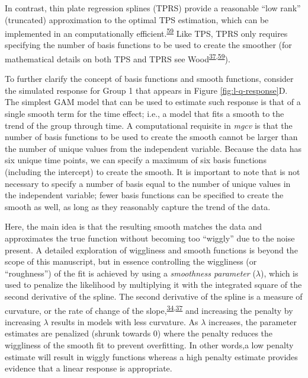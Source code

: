 \documentclass[
]{article}
\begin{document}
In contrast, thin plate regression splines (TPRS) provide a reasonable ``low rank'' (truncated) approximation to the optimal TPS estimation, which can be implemented in an computationally efficient.\textsuperscript{\protect\hyperlink{ref-wood2003}{59}} Like TPS, TPRS only requires specifying the number of basis functions to be used to create the smoother (for mathematical details on both TPS and TPRS see Wood\textsuperscript{\protect\hyperlink{ref-wood2017}{37},\protect\hyperlink{ref-wood2003}{59}}).

To further clarify the concept of basis functions and smooth functions, consider the simulated response for Group 1 that appears in Figure \ref{fig:l-q-response}D. The simplest GAM model that can be used to estimate such response is that of a single smooth term for the time effect; i.e., a model that fits a smooth to the trend of the group through time. A computational requisite in \emph{mgcv} is that the number of basis functions to be used to create the smooth cannot be larger than the number of unique values from the independent variable. Because the data has six unique time points, we can specify a maximum of six basis functions (including the intercept) to create the smooth. It is important to note that is not necessary to specify a number of basis equal to the number of unique values in the independent variable; fewer basis functions can be specified to create the smooth as well, as long as they reasonably capture the trend of the data.

Here, the main idea is that the resulting smooth matches the data and approximates the true function without becoming too ``wiggly'' due to the noise present. A detailed exploration of wiggliness and smooth functions is beyond the scope of this manuscript, but in essence controlling the wiggliness (or ``roughness'') of the fit is achieved by using a \emph{smoothness parameter} (\(\lambda\)), which is used to penalize the likelihood by multiplying it with the integrated square of the second derivative of the spline. The second derivative of the spline is a measure of curvature, or the rate of change of the slope,\textsuperscript{\protect\hyperlink{ref-simpson2018}{34},\protect\hyperlink{ref-wood2017}{37}} and increasing the penalty by increasing \(\lambda\) results in models with less curvature. As \(\lambda\) increases, the parameter estimates are penalized (shrunk towards 0) where the penalty reduces the wiggliness of the smooth fit to prevent overfitting. In other words,a low penalty estimate will result in wiggly functions whereas a high penalty estimate provides evidence that a linear response is appropriate.
\end{document}
